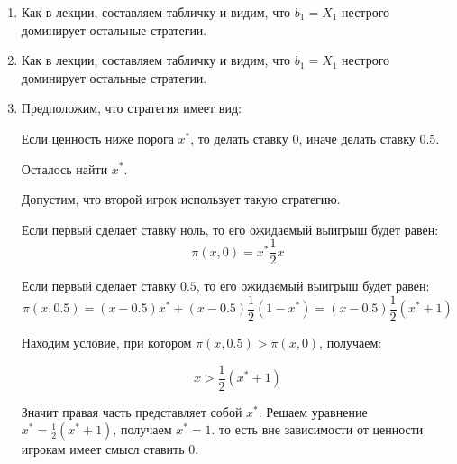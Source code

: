 \begin{enumerate}
\item Как в лекции, составляем табличку и видим, что $ b_{1}=X_{1} $ нестрого доминирует остальные стратегии.


\item  Как в лекции, составляем табличку и видим, что $ b_{1}=X_{1} $ нестрого доминирует остальные стратегии.

\item Предположим, что стратегия имеет вид:

Если ценность ниже порога $ x^{*} $, то делать ставку 0, иначе делать ставку $ 0.5 $.

Осталось найти $ x^{*} $.

Допустим, что второй игрок использует такую стратегию.

Если первый сделает ставку ноль, то его ожидаемый выигрыш будет равен:
\begin{equation}
\pi(x,0)=x^{*}\frac{1}{2}x
\end{equation}

Если первый сделает ставку $0.5$, то его ожидаемый выигрыш будет равен:
\begin{equation}
\pi(x,0.5)=(x-0.5)x^{*}+(x-0.5)\frac{1}{2}(1-x^{*})=(x-0.5)\frac{1}{2}(x^{*}+1)
\end{equation}

Находим условие, при котором $ \pi(x,0.5)>\pi(x,0) $, получаем:

\begin{equation}
x>\frac{1}{2}(x^{*}+1)
\end{equation}

Значит правая часть представляет собой $ x^{*} $. Решаем уравнение $x^{*}=\frac{1}{2}(x^{*}+1)  $, получаем $ x^{*}=1 $. то есть вне зависимости от ценности игрокам имеет смысл ставить 0.


\end{enumerate}
